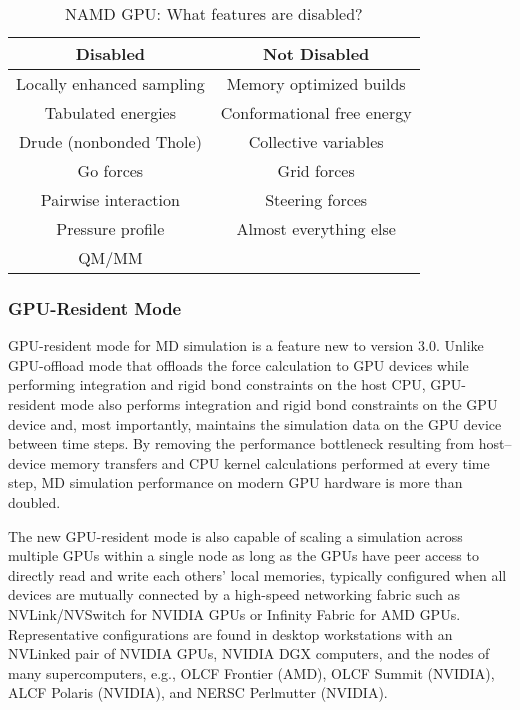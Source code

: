 \begin{table}[htb]
\caption{NAMD GPU: What features are disabled?}
\begin{center}
\begin{tabular}{c|c}
\textbf{Disabled} & \textbf{Not Disabled} \\ \hline
Locally enhanced sampling
  & Memory optimized builds \\
Tabulated energies
  & Conformational free energy \\
Drude (nonbonded Thole)
  & Collective variables \\
Go forces
  & Grid forces \\
Pairwise interaction
  & Steering forces \\
Pressure profile
  & Almost everything else \\
QM/MM
  &
\end{tabular}
\end{center}
\label{table:CUDA-disabled}
\end{table}


\subsubsection{GPU-Resident Mode}

GPU-resident mode for MD simulation is a feature new to version 3.0.
Unlike GPU-offload mode that offloads the force calculation to
GPU devices while performing integration and rigid bond constraints
on the host CPU,
GPU-resident mode also performs integration and rigid bond constraints
on the GPU device and, most importantly, maintains the simulation
data on the GPU device between time steps.
By removing the performance bottleneck resulting from
host--device memory transfers and CPU kernel calculations
performed at every time step,
MD simulation performance on modern GPU hardware is more than doubled.

The new GPU-resident mode is also capable of scaling a simulation across
multiple GPUs within a single node as long as the GPUs have peer access
to directly read and write each others' local memories,
typically configured when all devices are mutually connected by
a high-speed networking fabric such as NVLink/NVSwitch for NVIDIA GPUs
or Infinity Fabric for AMD GPUs.
Representative configurations are found in
desktop workstations with an NVLinked pair of NVIDIA GPUs,
NVIDIA DGX computers, and the nodes of many supercomputers,
e.g., OLCF Frontier (AMD), OLCF Summit (NVIDIA),
ALCF Polaris (NVIDIA), and NERSC Perlmutter (NVIDIA).

